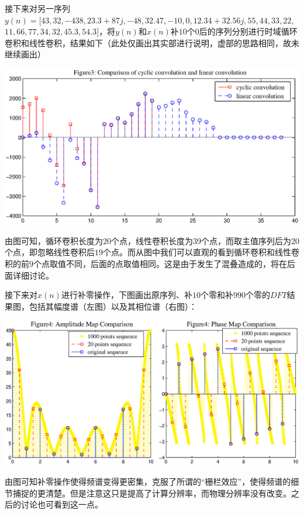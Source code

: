 \documentclass[a4paper,11pt,onecolumn,twoside]{article}
\begin{document}
接下来对另一序列$y(n) = [43, 32, -438, 23.3+87j, -48, 32.47, -10, 0, 12.34+32.56j, 55, 44, 33, 22,$ $11, 66, 77, 34, 32, 45.3, 54.3]$，将$y(n)$和$x(n)$补$10$个$0$后的序列分别进行时域循环卷积和线性卷积，结果如下（此处仅画出其实部进行说明，虚部的思路相同，故未继续画出）

\begin{center}
    \includegraphics[width=1\textwidth]{fig3.eps}
\end{center}
由图可知，循环卷积长度为$20$个点，线性卷积长度为$39$个点，而取主值序列后为$20$个点，即忽略线性卷积后$19$个点。而从图中我们可以直观的看到循环卷积和线性卷积的前$9$个点取值不同，后面的点取值相同。这是由于发生了混叠造成的，将在后面详细讨论。

接下来对$x(n)$进行补零操作，下图画出原序列、补$10$个零和补$990$个零的$DFT$结果图，包括其幅度谱（左图）以及其相位谱（右图）：

\begin{center}
    \includegraphics[width=1\textwidth]{fig4.eps}
\end{center}
由图可知补零操作使得频谱变得更密集，克服了所谓的``栅栏效应''，使得频谱的细节捕捉的更清楚。但是注意这只是提高了计算分辨率，而物理分辨率没有改变。之后的讨论也可看到这一点。
\end{document}

